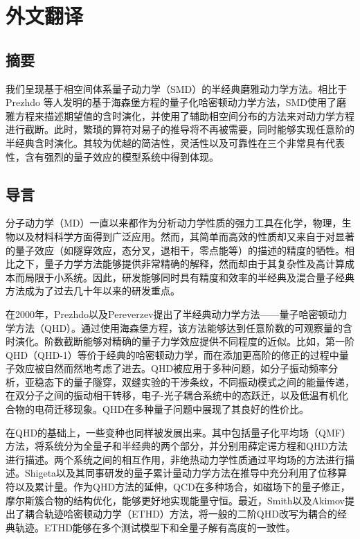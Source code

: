 \cleardoublepage
\chapter{外文翻译}

\section*{摘要}
我们呈现基于相空间体系量子动力学（SMD）的半经典磨雅动力学方法。相比于Prezhdo    等人发明的基于海森堡方程的量子化哈密顿动力学方法，SMD使用了磨雅方程来描述期望值的含时演化，并使用了辅助相空间分布的方法来对动力学方程进行截断。此时，繁琐的算符对易子的推导将不再被需要，同时能够实现任意阶的半经典含时演化。其较为优越的简洁性，灵活性以及可靠性在三个非常具有代表性，含有强烈的量子效应的模型系统中得到体现。

\section{导言}
分子动力学（MD）一直以来都作为分析动力学性质的强力工具在化学，物理，生物以及材料科学方面得到广泛应用。然而，其简单而高效的性质却又来自于对显著的量子效应（如隧穿效应，态分叉，退相干，零点能等）的描述的精度的牺牲。相比之下，量子力学方法能够提供非常精确的解释，然而却由于其复杂性及高计算成本而局限于小系统。因此，研发能够同时具有精度和效率的半经典及混合量子经典方法成为了过去几十年以来的研发重点。

在2000年，Prezhdo以及Pereverzev提出了半经典动力学方法——量子哈密顿动力学方法（QHD）。通过使用海森堡方程，该方法能够达到任意阶数的可观察量的含时演化。阶数截断能够对精确的量子力学效应提供不同程度的近似。比如，第一阶QHD（QHD-1）等价于经典的哈密顿动力学，而在添加更高阶的修正的过程中量子效应被自然而然地考虑了进去。QHD被应用于多种问题，如分子振动频率分析，亚稳态下的量子隧穿，双缝实验的干涉条纹，不同振动模式之间的能量传递，在双分子之间的振动相干转移，电子-光子耦合系统中的态跃迁，以及低温有机化合物的电荷迁移现象。QHD在多种量子问题中展现了其良好的性价比。

在QHD的基础上，一些变种也同样被发展出来。其中包括量子化平均场（QMF）方法，将系统分为全量子和半经典的两个部分，并分别用薛定谔方程和QHD方法进行描述。两个系统之间的相互作用，非绝热动力学性质通过平均场的方法进行描述。Shigeta以及其同事研发的量子累计量动力学方法在推导中充分利用了位移算符以及累计量。作为QHD方法的延伸，QCD在多种场合，如磁场下的量子修正，摩尔斯簇合物的结构优化，能够更好地实现能量守恒。最近，Smith以及Akimov提出了耦合轨迹哈密顿动力学（ETHD）方法，将一般的二阶QHD改写为耦合的经典轨迹。ETHD能够在多个测试模型下和全量子解有高度的一致性。

